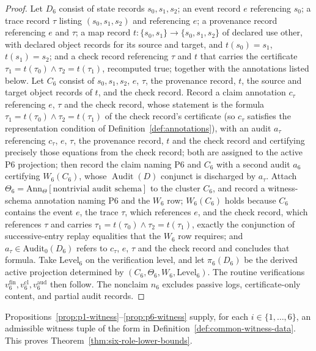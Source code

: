 \documentclass[11pt]{article}
\theoremstyle{definition}
\newcommand{\Audit}[1]{\ensuremath{\operatorname{Audit}\!\left(#1\right)}}
\newcommand{\Psix}{\ensuremath{\mathrm{P6}}}
\begin{document}
\begin{proof}
Let \(D_6\) consist of state records \(s_0,s_1,s_2\); an event record \(e\)
referencing \(s_0\); a trace record \(\tau\) listing \((s_0,s_1,s_2)\) and
referencing \(e\); a provenance record referencing \(e\) and \(\tau\); a map
record \(t:\{s_0,s_1\}\to\{s_0,s_1,s_2\}\) of declared use other, with declared
object records for its source and target, and \(t(s_0)=s_1\), \(t(s_1)=s_2\); and a
check record referencing \(\tau\) and \(t\) that carries the certificate
\(\tau_1=t(\tau_0)\wedge\tau_2=t(\tau_1)\), recomputed true; together with the annotations listed below. Let \(C_6\) consist of \(s_0,s_1,s_2\), \(e\), \(\tau\), the provenance record, \(t\), the source and target object records of \(t\), and the check record. Record a claim annotation \(c_\tau\) referencing \(e\), \(\tau\) and the check record, whose statement is the formula \(\tau_1=t(\tau_0)\wedge\tau_2=t(\tau_1)\) of the check record's certificate (so \(c_\tau\) satisfies the representation condition of Definition~\ref{def:annotations}), with an audit \(a_\tau\) referencing
\(c_\tau\), \(e\), \(\tau\), the provenance record, \(t\) and the check record and certifying
precisely those equations from the check record; both are assigned to the
active \Psix{} projection; then record the claim naming \Psix{} and
\(C_6\) with a second audit \(a_6\) certifying \(W_6(C_6)\), whose
\(\Audit{D}\) conjunct is discharged by \(a_\tau\). Attach
\(\Theta_6 = \mathrm{Ann}_\Theta[\text{nontrivial audit schema}]\) to
the cluster \(C_6\), and record a
witness-schema annotation naming \Psix{} and the \(W_6\) row; \(W_6(C_6)\)
holds because \(C_6\) contains the event \(e\), the trace \(\tau\), which
references \(e\), and the check record, which references \(\tau\) and carries
\(\tau_1=t(\tau_0)\wedge\tau_2=t(\tau_1)\), exactly the conjunction of
successive-entry replay equalities that the \(W_6\) row requires; and
\(a_\tau\in\mathrm{Audit}_0(D_6)\) refers to \(c_\tau\), \(e\), \(\tau\) and the check
record and concludes that formula. Take \(\mathrm{Level}_6\) on the verification
level, and let \(\pi_6(D_6)\) be the derived active projection
determined by \((C_6,\Theta_6,W_6,\mathrm{Level}_6)\). The routine
verifications \(v_6^{\mathrm{fin}}, v_6^{\mathrm{cl}},
v_6^{\mathrm{aud}}\) then follow. The nonclaim \(n_6\) excludes passive
logs, certificate-only content, and partial audit records.
\end{proof}

Propositions~\ref{prop:p1-witness}--\ref{prop:p6-witness} supply, for
each \(i \in \{1,\ldots,6\}\), an admissible witness tuple of the
form in Definition~\ref{def:common-witness-data}. This proves
Theorem~\ref{thm:six-role-lower-bounds}.
\end{document}
